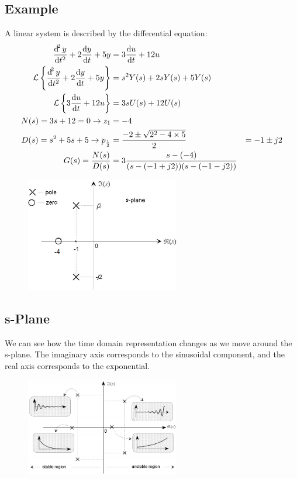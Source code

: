 \documentclass[class=report, crop=false, 12pt,a4paper]{standalone}
\begin{document}
\subsection{Example}
A linear system is described by the differential equation:
\begin{align}
  \frac{\dif^2 y}{\dif t^2} + 2 \frac{\dif y}{\dif t} + 5y &= 3 \frac{\dif u}{\dif t} + 12 u\\
  \mathcal{L} \left\{ \frac{\dif^2 y}{\dif t^2} + 2 \frac{\dif y}{\dif t} + 5y \right\} &= s^2 Y(s) + 2s Y(s) + 5Y(s)\\
  \mathcal{L} \left\{ 3 \frac{\dif u}{\dif t} + 12 u \right\} &= 3sU(s) + 12U(s)\\
  N(s) = 3s + 12 = 0 \rightarrow z_1 &= -4\\
  D(s) = s^2 + 5s + 5 \rightarrow p_{\frac{1}{2}} &= \frac{-2\pm\sqrt{2^2 - 4\times 5}}{2} &= -1 \pm j2\\
  G(s) = \frac{N(s)}{D(s)} &= 3\frac{s-(-4)}{(s-(-1+j2))(s-(-1-j2))}
\end{align}
\begin{figure}[H]
  \centering
  \includegraphics[width = 0.6\textwidth]{../img/diagram67.png}
\end{figure}
\subsection{s-Plane}
We can see how the time domain representation changes as we move around the s-plane. The imaginary axis corresponds to the sinusoidal component, and the real axis corresponds to the exponential.
\begin{figure}[H]
  \centering
  \includegraphics[width = 0.6\textwidth]{../img/diagram68.png}
\end{figure}
\end{document}
